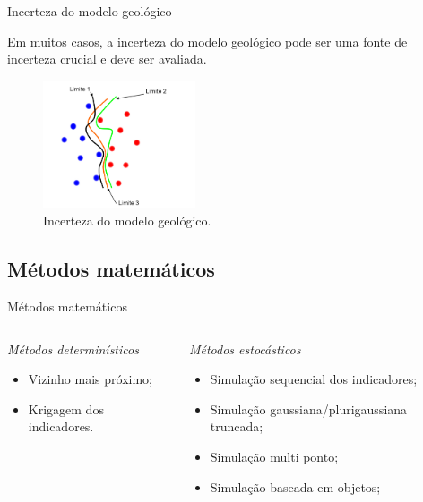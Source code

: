 \documentclass[aspectratio=169]{beamer}
\begin{document}
\begin{frame}{Incerteza do modelo geológico}

Em muitos casos, a incerteza do modelo geológico pode ser uma fonte de incerteza crucial e deve ser avaliada.

\begin{figure}[H]
	\begin{center}
		\includegraphics[width=0.4\textwidth]{capitulo_1/incerteza_limites}
		\caption{Incerteza do modelo geológico.}
	\end{center}
\end{figure}
\end{frame}

\subsection{Métodos matemáticos}

\begin{frame}{Métodos matemáticos}

	\begin{columns}[t]
		\begin{column}{0.5\textwidth}
			\begin{center}
				\textit{Métodos determinísticos}
			\end{center}
			\begin{itemize}
				\item Vizinho mais próximo;
				\item Krigagem dos indicadores.
			\end{itemize}
		\end{column}
		\begin{column}{0.5\textwidth}
			\begin{center}
				\textit{Métodos estocásticos}
			\end{center}
			\begin{itemize}
				\item Simulação sequencial dos indicadores;
				\item Simulação gaussiana/plurigaussiana truncada;
				\item Simulação multi ponto;
				\item Simulação baseada em objetos;
			\end{itemize}
		\end{column}
	\end{columns}
	
\end{frame}
\end{document}
